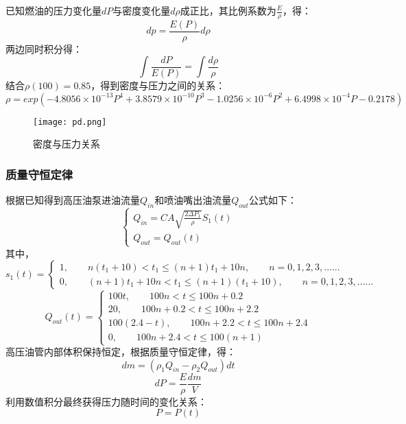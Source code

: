 \documentclass{cumcmthesis}
\begin{document}
已知燃油的压力变化量$dP$与密度变化量$d\rho$成正比，其比例系数为$\frac{E}{\rho}$，得：
\begin{equation}
dp=\frac{E(P)}{\rho}d\rho
\end{equation}
两边同时积分得：
\begin{equation}
	\int{\frac{dP}{E(P)}}=\int{\frac{d\rho}{\rho}}
\end{equation}
结合$\rho(100)=0.85$，得到密度与压力之间的关系：
\begin{equation}
\rho=exp(-4.8056\times 10^{-13}P^{4}+3.8579\times 10^{-10}P^{3}-1.0256\times 10^{-6}P^{2}+6.4998\times 10^{-4}P-0.2178)
\end{equation}

\begin{figure}[!htbp]
	\centering
	\texttt{[image: pd.png]}
	\caption{密度与压力关系}\label{4}
\end{figure}

\subsubsection{质量守恒定律}	
根据已知得到高压油泵进油流量$Q_{in}$和喷油嘴出油流量$Q_{out}$公式如下：
\begin{equation}
\begin{cases}
Q_{in}=CA\sqrt{\frac{2\Delta P_{1}}{\rho}}S_{1}(t)\\
Q_{out}=Q_{out}(t)
\end{cases}
\end{equation}
其中，
\begin{equation}
s_{1}(t)=
\begin{cases}
1,\qquad n(t_{1}+10)< t_{1} \leq (n+1)t_{1}+10n,\qquad n=0,1,2,3,......\\
0,\qquad (n+1)t_{1}+10n < t_{1} \leq (n+1)(t_{1}+10),\qquad n=0,1,2,3,......
\end{cases}
\end{equation}
\begin{equation}
Q_{out}(t)=
\begin{cases}
100t,\qquad 100n<t\leq 100n+0.2\\
20, \qquad 100n+0.2<t\leq 100n+2.2\\
100(2.4-t), \qquad 100n+2.2<t\leq 100n+2.4\\
0, \qquad 100n+2.4<t\leq 100(n+1)
\end{cases}
\end{equation}
高压油管内部体积保持恒定，根据质量守恒定律，得：
	\begin{equation}
	dm=(\rho_{1} Q_{in}-\rho_{2}Q_{out})dt
	\end{equation}
	\begin{equation}
dP=\frac{E}{\rho}\frac{dm}{V}
\end{equation}
利用数值积分最终获得压力随时间的变化关系：
\begin{equation}
P=P(t)
\end{equation}
\end{document}
